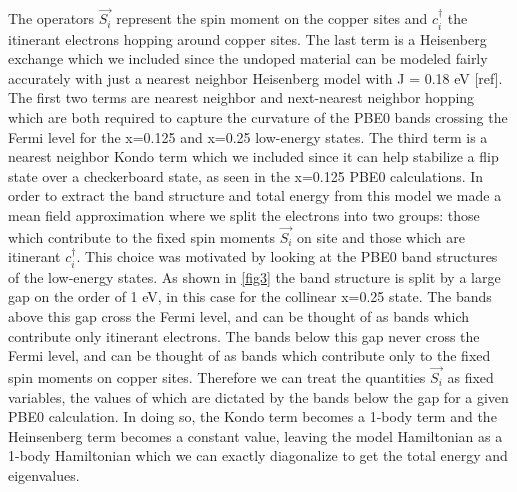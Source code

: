 \documentclass{article}
\begin{document}
The operators $\vec{S_i}$ represent the spin moment on the copper sites and $c_i^\dagger$ the itinerant electrons hopping around copper sites. The last term is a Heisenberg exchange which we included since the undoped material can be modeled fairly accurately with just a nearest neighbor Heisenberg model with J = 0.18 eV [ref]. The first two terms are nearest neighbor and next-nearest neighbor hopping which are both required to capture the curvature of the PBE0 bands crossing the Fermi level for the x=0.125 and x=0.25 low-energy states. The third term is a nearest neighbor Kondo term which we included since it can help stabilize a flip state over a checkerboard state, as seen in the x=0.125 PBE0 calculations. In order to extract the band structure and total energy from this model we made a mean field approximation where we split the electrons into two groups: those which contribute to the fixed spin moments $\vec{S_i}$ on site and those which are itinerant $c_i^\dagger$. This choice was motivated by looking at the PBE0 band structures of the low-energy states. As shown in \ref{fig3} the band structure is split by a large gap on the order of 1 eV, in this case for the collinear x=0.25 state. The bands above this gap cross the Fermi level, and can be thought of as bands which contribute only itinerant electrons. The bands below this gap never cross the Fermi level, and can be thought of as bands which contribute only to the fixed spin moments on copper sites. Therefore we can treat the quantities $\vec{S_i}$ as fixed variables, the values of which are dictated by the bands below the gap for a given PBE0 calculation. In doing so, the Kondo term becomes a 1-body term and the Heinsenberg term becomes a constant value, leaving the model Hamiltonian as a 1-body Hamiltonian which we can exactly diagonalize to get the total energy and eigenvalues. 
\end{document}
